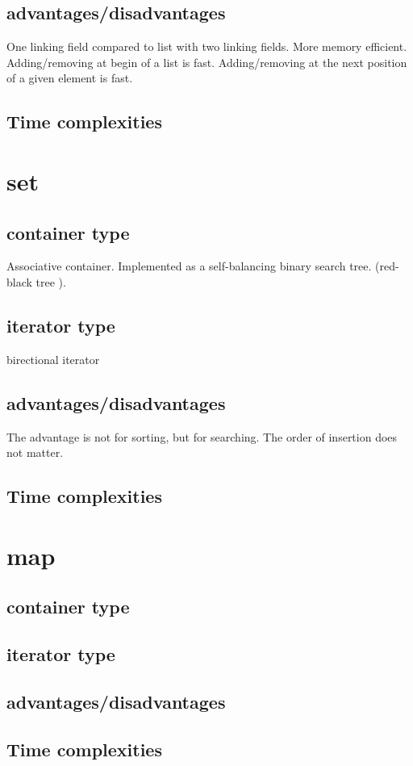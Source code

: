 \documentclass{report}
\begin{document}
    \subsection{advantages/disadvantages}
    One linking field compared to list with two linking fields. More memory efficient.
    \bigbreak \noindent
    Adding/removing at begin of a list is fast. Adding/removing at the next  position of a given element is fast.
    \subsection{Time complexities}
    \section{set}
    \subsection{container type} 
    Associative container. Implemented as a self-balancing binary search tree. (red-black tree ).

    \subsection{iterator type}
    birectional iterator
    \subsection{advantages/disadvantages}
    The advantage is not for sorting, but for searching.
    The order of insertion does not matter.
    \subsection{Time complexities}

    \section{map}
    \subsection{container type} 
    \subsection{iterator type}
    \subsection{advantages/disadvantages}
    \subsection{Time complexities}
\end{document}
